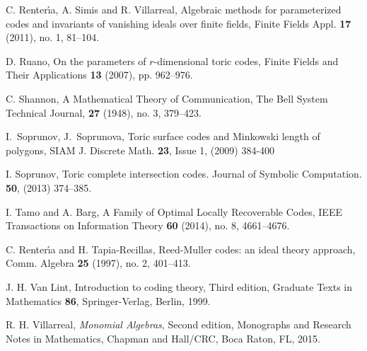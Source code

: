 \documentclass[12pt]{amsart}
\theoremstyle{plain}
\begin{document}
\begin{thebibliography}{99}
 C. Renter\'\i a, A. Simis and R. Villarreal,
Algebraic methods for parameterized codes and invariants of vanishing ideals over finite fields,
Finite Fields Appl. {\bf 17} (2011), no. 1, 81--104.

D. Ruano, 
{On the parameters of $r$-dimensional toric codes},
Finite Fields and Their Applications {\bf 13} (2007), pp. 962--976.

 C. Shannon,
A Mathematical Theory of Communication,
The Bell System Technical Journal, {\bf 27} (1948), no. 3, 379--423.

 I.~Soprunov, J.~Soprunova, {Toric surface codes and Minkowski length of polygons}, SIAM J. Discrete Math. {\bf 23}, Issue 1, (2009) 384-400 

 I. Soprunov,  {Toric complete intersection codes.} Journal of Symbolic Computation. {\bf 50}, (2013) 374--385.

 I. Tamo and A. Barg,
A Family of Optimal Locally Recoverable Codes,
IEEE Transactions on Information Theory {\bf 60} (2014), no. 8, 4661--4676.

 C. Renter\'\i a and H. Tapia-Recillas, 
Reed-Muller codes: an ideal theory approach, Comm. Algebra {\bf 25}
(1997), no. 2, 401--413.

 J. H. Van Lint,
{ Introduction to coding theory},
Third edition, Graduate Texts in Mathematics {\bf 86}, Springer-Verlag, Berlin, 1999.

 R. H. Villarreal, {\it Monomial Algebras\/},
Second edition, 
Monographs and Research Notes in Mathematics, Chapman and Hall/CRC,
Boca Raton, FL, 2015.
\end{thebibliography}
\end{document}
